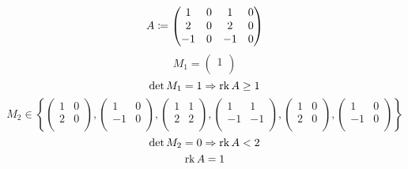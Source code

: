 \begin{example}
  $$
    A\coloneqq
    \begin{pmatrix}
      1  & 0 & 1  & 0 \\
      2  & 0 & 2  & 0 \\
      -1 & 0 & -1 & 0 \\
    \end{pmatrix}
  $$
  $$
    M_1=
    \begin{pmatrix}
      1 \\
    \end{pmatrix}
  $$
  $$\det M_1=1\Rightarrow \operatorname{rk} A\ge 1$$
  $$
    M_2\in\left\{ 
    \begin{pmatrix}
      1 & 0 \\
      2 & 0 \\
    \end{pmatrix}
    ,
    \begin{pmatrix}
      1  & 0 \\
      -1 & 0 \\
    \end{pmatrix}
    ,
    \begin{pmatrix}
      1 & 1 \\
      2 & 2 \\
    \end{pmatrix}
    ,
    \begin{pmatrix}
      1  & 1  \\
      -1 & -1 \\
    \end{pmatrix}
    ,
    \begin{pmatrix}
      1 & 0 \\
      2 & 0 \\
    \end{pmatrix}
    ,
    \begin{pmatrix}
      1  & 0 \\
      -1 & 0 \\
    \end{pmatrix}
    \right\}
  $$
  $$
    \det M_2=0\Rightarrow \operatorname{rk} A<2
  $$
  $$\operatorname{rk} A = 1$$
\end{example}

